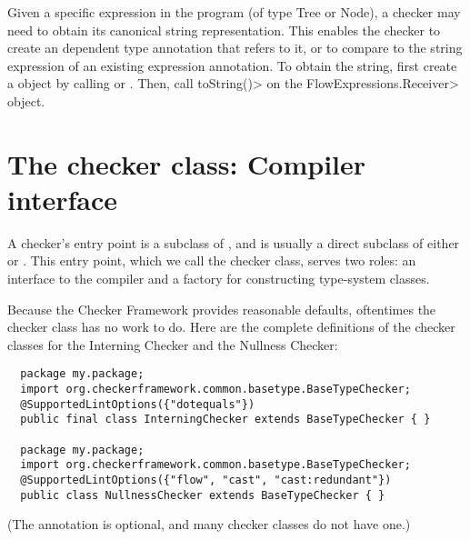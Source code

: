 Given a specific expression in the program (of type Tree or Node), a
checker may need to obtain its canonical string representation.  This
enables the checker to create an dependent type annotation that refers to
it, or to compare to the string expression of an existing expression
annotation.
To obtain the string, first create a
 object by calling
 or
.
Then, call \<toString()> on the \<FlowExpressions.Receiver> object.


\section{The checker class:  Compiler interface\label{creating-compiler-interface}}

A checker's entry point is a subclass of
, and is usually a direct subclass
of either  or
.
This entry
point, which we call the checker class, serves two
roles:  an interface to the compiler and a factory for constructing
type-system classes.

Because the Checker Framework provides reasonable defaults, oftentimes the
checker class has no work to do.  Here are the complete definitions of the
checker classes for the Interning Checker and the Nullness Checker:

\begin{Verbatim}
  package my.package;
  import org.checkerframework.common.basetype.BaseTypeChecker;
  @SupportedLintOptions({"dotequals"})
  public final class InterningChecker extends BaseTypeChecker { }

  package my.package;
  import org.checkerframework.common.basetype.BaseTypeChecker;
  @SupportedLintOptions({"flow", "cast", "cast:redundant"})
  public class NullnessChecker extends BaseTypeChecker { }
\end{Verbatim}

(The  annotation is
optional, and many checker classes do not have one.)

